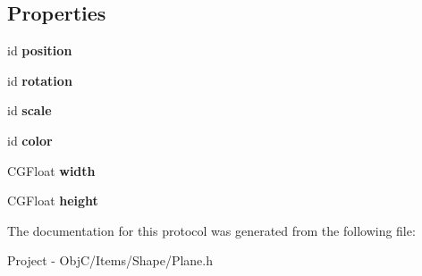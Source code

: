 \subsection*{Properties}
\begin{DoxyCompactItemize}
\item 
\hypertarget{protocol_plane_export-p_a20552000fe3ebbb82c47d3b1a6e1b77a}{}id {\bfseries position}\label{protocol_plane_export-p_a20552000fe3ebbb82c47d3b1a6e1b77a}

\item 
\hypertarget{protocol_plane_export-p_af4061310e470a6fe0a6737f964f41f47}{}id {\bfseries rotation}\label{protocol_plane_export-p_af4061310e470a6fe0a6737f964f41f47}

\item 
\hypertarget{protocol_plane_export-p_ae5b9323c266335c8e3cedc4e385780bb}{}id {\bfseries scale}\label{protocol_plane_export-p_ae5b9323c266335c8e3cedc4e385780bb}

\item 
\hypertarget{protocol_plane_export-p_a25d338da33b3256576f6505703b21c89}{}id {\bfseries color}\label{protocol_plane_export-p_a25d338da33b3256576f6505703b21c89}

\item 
\hypertarget{protocol_plane_export-p_a4da5e87344ffa74a6a023d969aa0be63}{}C\+G\+Float {\bfseries width}\label{protocol_plane_export-p_a4da5e87344ffa74a6a023d969aa0be63}

\item 
\hypertarget{protocol_plane_export-p_a0bc458aa595564fc4bf070fe4120239a}{}C\+G\+Float {\bfseries height}\label{protocol_plane_export-p_a0bc458aa595564fc4bf070fe4120239a}

\end{DoxyCompactItemize}


The documentation for this protocol was generated from the following file\+:\begin{DoxyCompactItemize}
\item 
Project -\/ Obj\+C/\+Items/\+Shape/Plane.\+h\end{DoxyCompactItemize}
